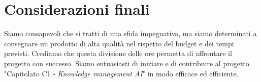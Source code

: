 \section{Considerazioni finali}

Siamo consapevoli che si tratti di una sfida impegnativa, ma siamo determinati a
consegnare un prodotto di alta qualità nel rispetto del budget e dei tempi
previsti. Crediamo che questa divisione delle ore permetta di affrontare il
progetto con successo. Siamo entuasiasti di iniziare e di contribuire al
progetto "Capitolato C1 - \textit{Knowledge management AI}" in modo efficace ed
efficiente.
